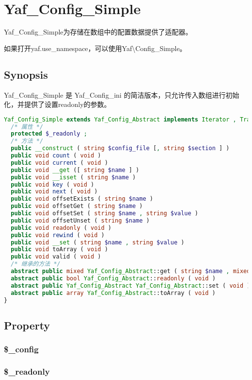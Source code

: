 \chapter{Yaf\_Config\_Simple}

Yaf\_Config\_Simple为存储在数组中的配置数据提供了适配器。

如果打开yaf.use\_namespace，可以使用Yaf\textbackslash Config\_Simple。



\section{Synopsis}


Yaf\_Config\_Simple 是 Yaf\_Config\_ini 的简洁版本，只允许传入数组进行初始化，并提供了设置readonly的参数。

\begin{lstlisting}[language=PHP]
Yaf_Config_Simple extends Yaf_Config_Abstract implements Iterator , Traversable , ArrayAccess , Countable {
  /* 属性 */
  protected $_readonly ;
  /* 方法 */
  public __construct ( string $config_file [, string $section ] )
  public void count ( void )
  public void current ( void )
  public void __get ([ string $name ] )
  public void __isset ( string $name )
  public void key ( void )
  public void next ( void )
  public void offsetExists ( string $name )
  public void offsetGet ( string $name )
  public void offsetSet ( string $name , string $value )
  public void offsetUnset ( string $name )
  public void readonly ( void )
  public void rewind ( void )
  public void __set ( string $name , string $value )
  public void toArray ( void )
  public void valid ( void )
  /* 继承的方法 */
  abstract public mixed Yaf_Config_Abstract::get ( string $name , mixed $value )
  abstract public bool Yaf_Config_Abstract::readonly ( void )
  abstract public Yaf_Config_Abstract Yaf_Config_Abstract::set ( void )
  abstract public array Yaf_Config_Abstract::toArray ( void )
}
\end{lstlisting}


\section{Property}

\subsection{\$\_config}



\subsection{\$\_readonly}


